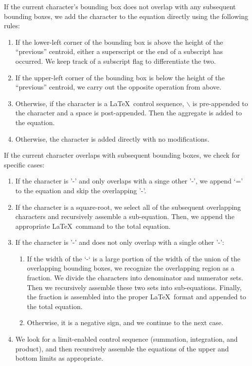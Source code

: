 \documentclass[journal]{IEEEtran}
\begin{document}
If the current character's bounding box does not overlap with any subsequent bounding boxes, we add the character to the equation directly using the following rules:
\begin{enumerate}
    \item If the lower-left corner of the bounding box is above the height of the “previous” centroid, either a superscript or the end of a subscript has occurred. We keep track of a subscript flag to differentiate the two.
    \item If the upper-left corner of the bounding box is below the height of the “previous” centroid, we carry out the opposite operation from above.
    \item Otherwise, if the character is a \LaTeX\ control sequence, $\backslash$ is pre-appended to the character and a space is post-appended. Then the aggregate is added to the equation.
    \item Otherwise, the character is added directly with no modifications.
    
\end{enumerate}

If the current character overlaps with subsequent bounding boxes, we check for specific cases:
\begin{enumerate}    
    \item If the character is '-' and only overlaps with a singe other '-', we append ‘=’ to the equation and skip the overlapping '-'.
    \item If the character is a square-root, we select all of the subsequent overlapping characters and recursively assemble a sub-equation. Then, we append the appropriate \LaTeX\ command to the total equation.
    \item If the character is '-' and does not only overlap with a single other '-':
    \begin{enumerate}
	    \item If the width of the ‘-‘ is a large portion of the width of the union of the overlapping bounding boxes, we recognize the overlapping region as a fraction. We divide the characters into  denominator and numerator sets. Then we recursively assemble these two sets into sub-equations. Finally, the fraction is assembled into the proper \LaTeX\ format and appended to the total equation.
	    \item Otherwise, it is a negative sign, and we continue to the next case.
	\end{enumerate}
    \item We look for a limit-enabled control sequence (summation, integration, and product), and then recursively assemble the equations of the upper and bottom limits as appropriate.
\end{enumerate}
\end{document}
